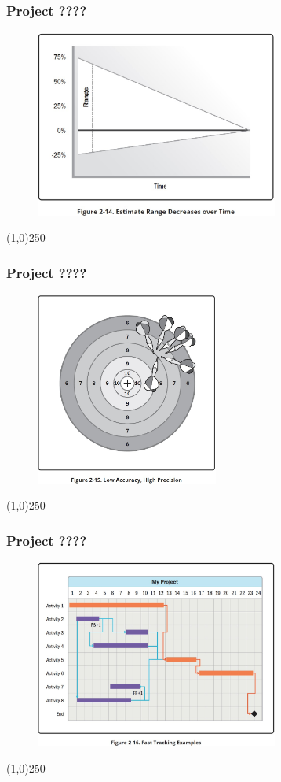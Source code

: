 \begin{frame}
\frametitle{Project ????}
 \begin{figure}
    \centering
        \includegraphics[width = 8cm]{../images/guide/Fig2-14.jpg}
    \label{guidefig:2-14}
 \end{figure}
\end{frame}
\begin{center}\line(1,0){250}\end{center}

\begin{frame}
\frametitle{Project ????}
 \begin{figure}
    \centering
        \includegraphics[width = 6cm]{../images/guide/Fig2-15.jpg}
    \label{guidefig:2-15}
 \end{figure}
\end{frame}
\begin{center}\line(1,0){250}\end{center}

\begin{frame}
\frametitle{Project ????}
 \begin{figure}
    \centering
        \includegraphics[width = 8cm]{../images/guide/Fig2-16.jpg}
    \label{guidefig:2-16}
 \end{figure}
\end{frame}
\begin{center}\line(1,0){250}\end{center}

